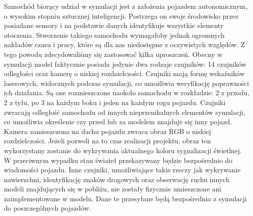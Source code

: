Samochód biorący udział w symulacji jest z założenia pojazdem autonomicznym, o wysokim stopniu sztucznej inteligencji. Postrzega on swoje środowisko przez posiadane sensory i na podstawie danych identyfikuje wszystkie elementy otoczenia. Stworzenie takiego samochodu wymagałoby jednak ogromnych nakładów czasu i pracy, które są dla nas niedostępne z oczywistych względów. Z tego powodu zdecydowaliśmy się zastosować kilka uproszczeń. Obecny w symulacji model faktycznie posiada jedynie dwa rodzaje czujników: 14 czujników odległości oraz kamerę o niskiej rozdzielczości. Czujniki mają formę wskaźników laserowych, widocznych podczas symulacji, co umożliwia weryfikację poprawności ich działania. Są one rozmieszczone naokoło samochodu w rozkładzie: 2 z przodu, 2 z tyłu, po 3 na każdym boku i jeden na każdym rogu pojazdu. Czujniki zwracają odległość samochodu od innych nieprzenikalnych elementów symulacji, co umożliwia określenie czy przed lub za modelem znajduje się inny pojazd. Kamera zamieszczona na dachu pojazdu zwraca obraz RGB o niskiej rozdzielczości. Jeżeli pozwoli na to czas realizacji projektu, obraz ten wykorzystany zostanie do wykrywania aktualnego koloru sygnalizacji świetlnej. W przeciwnym wypadku stan świateł przekazywany będzie bezpośrednio do wiadomości pojazdu. Inne czujniki, umożliwiające takie rzeczy jak wykrywanie nawierzchni, identyfikację znaków drogowych oraz obserwację ruchu innych modeli znajdujących się w pobliżu, nie zostały fizycznie umieszczone ani zaimplementowane w modelu. Dane te przesyłane będą bezpośrednio z symulacji do poszczególnych pojazdów.


